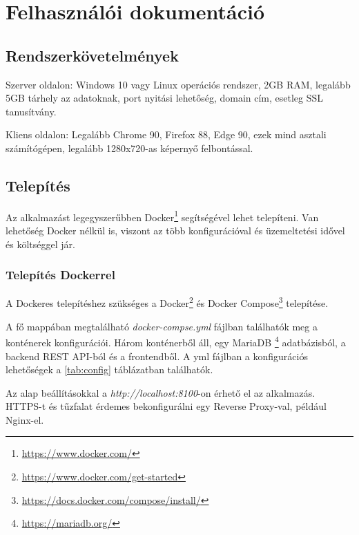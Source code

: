 \chapter{Felhasználói dokumentáció} %
\label{ch:user}

\section{Rendszerkövetelmények}
Szerver oldalon: Windows 10 vagy Linux operációs rendszer, 2GB RAM, legalább 5GB tárhely az adatoknak, port nyitási lehetőség, domain cím, esetleg SSL tanusítvány.

Kliens oldalon: Legalább Chrome 90, Firefox 88, Edge 90, ezek mind asztali számítógépen, legalább 1280x720-as képernyő felbontással.

\section{Telepítés}

Az alkalmazást legegyszerűbben Docker\footnote{\url{https://www.docker.com/}} segítségével lehet telepíteni. Van lehetőség Docker nélkül is, viszont az több konfigurációval és üzemeltetési idővel és költséggel jár.

\subsection{Telepítés Dockerrel}

A Dockeres telepítéshez szükséges a Docker\footnote{\url{https://www.docker.com/get-started}} és Docker Compose\footnote{\url{https://docs.docker.com/compose/install/}} telepítése.

A fő mappában megtalálható \textit{docker-compse.yml} fájlban találhatók meg a konténerek konfigurációi. Három konténerből áll, egy MariaDB \footnote{\url{https://mariadb.org/}} adatbázisból, a backend REST API-ból és a frontendből.
A yml fájlban a konfigurációs lehetőségek a \ref{tab:config} táblázatban találhatók.

Az alap beállításokkal a \textit{http://localhost:8100}-on érhető el az alkalmazás. HTTPS-t és tűzfalat érdemes bekonfigurálni egy Reverse Proxy\cite{nginxReverseProxy}-val, például Nginx-el.


